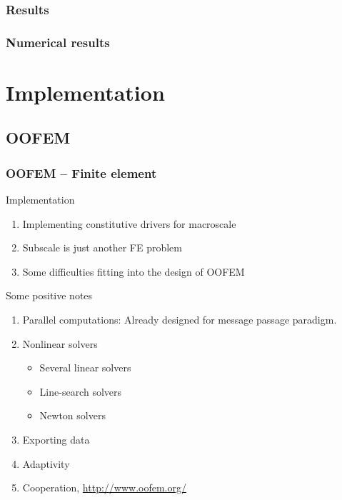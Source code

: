 \documentclass[11pt,mathserif]{beamer}
\begin{document}
\subsubsection{Results}
\begin{frame}
 \frametitle{Numerical results}
\begin{center}

\end{center}
\end{frame}

\section{Implementation}
\subsection{OOFEM}
\begin{frame}
 \frametitle{OOFEM -- Finite element }
 Implementation
 \begin{enumerate}
  \item Implementing constitutive drivers for macroscale
  \item Subscale is just another FE problem
  \item Some difficulties fitting into the design of OOFEM
 \end{enumerate}

 Some positive notes
 \begin{enumerate}
  \item<2-> Parallel computations: Already designed for message passage paradigm.
  \item<2-> Nonlinear solvers
  \begin{itemize}
   \item<2-> Several linear solvers
   \item<2-> Line-search solvers
   \item<2-> Newton solvers
  \end{itemize}
  \item<2-> Exporting data
  \item<2-> Adaptivity
  \item<2-> Cooperation, \url{http://www.oofem.org/}
 \end{enumerate}

\end{frame}
\end{document}
